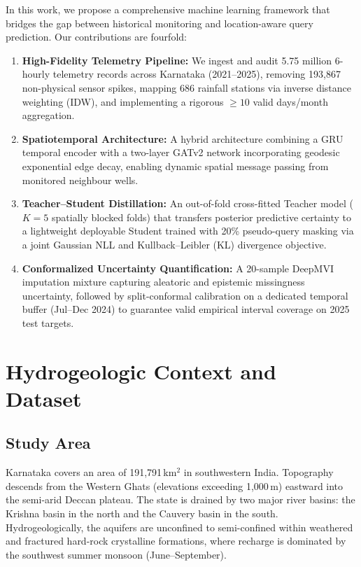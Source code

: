 \documentclass[10pt,journal,compsoc]{IEEEtran}
\begin{document}
In this work, we propose a comprehensive machine learning framework that bridges the gap between historical monitoring and location-aware query prediction. Our contributions are fourfold:
\begin{enumerate}
    \item \textbf{High-Fidelity Telemetry Pipeline:} We ingest and audit 5.75 million 6-hourly telemetry records across Karnataka (2021--2025), removing 193,867 non-physical sensor spikes, mapping 686 rainfall stations via inverse distance weighting (IDW), and implementing a rigorous $\ge 10$ valid days/month aggregation.
    \item \textbf{Spatiotemporal Architecture:} A hybrid architecture combining a GRU temporal encoder with a two-layer GATv2 network incorporating geodesic exponential edge decay, enabling dynamic spatial message passing from monitored neighbour wells.
    \item \textbf{Teacher--Student Distillation:} An out-of-fold cross-fitted Teacher model ($K=5$ spatially blocked folds) that transfers posterior predictive certainty to a lightweight deployable Student trained with 20\% pseudo-query masking via a joint Gaussian NLL and Kullback--Leibler (KL) divergence objective.
    \item \textbf{Conformalized Uncertainty Quantification:} A 20-sample DeepMVI imputation mixture capturing aleatoric and epistemic missingness uncertainty, followed by split-conformal calibration on a dedicated temporal buffer (Jul--Dec 2024) to guarantee valid empirical interval coverage on 2025 test targets.
\end{enumerate}

\section{Hydrogeologic Context and Dataset}
\subsection{Study Area}
Karnataka covers an area of 191,791\,km$^2$ in southwestern India. Topography descends from the Western Ghats (elevations exceeding 1,000\,m) eastward into the semi-arid Deccan plateau. The state is drained by two major river basins: the Krishna basin in the north and the Cauvery basin in the south. Hydrogeologically, the aquifers are unconfined to semi-confined within weathered and fractured hard-rock crystalline formations, where recharge is dominated by the southwest summer monsoon (June--September).
\end{document}
